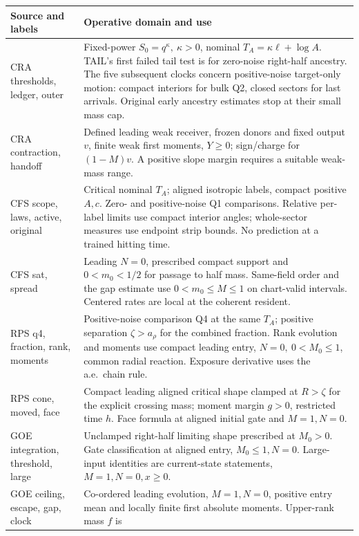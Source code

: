 \documentclass[11pt]{article}
\begin{document}
\small
\begin{longtable}{@{}>{\raggedright\arraybackslash}p{}>{\raggedright\arraybackslash}p{}@{}}
\toprule Source and labels & Operative domain and use\\\midrule\endhead
CRA thresholds, ledger, outer &
Fixed-power \(S_0=q^\kappa,\ \kappa>0\), nominal \(T_A=\kappa\ell+\log A\).
TAIL's first failed tail test is for zero-noise right-half ancestry.
The five subsequent clocks concern positive-noise target-only motion:
compact interiors for bulk Q2, closed sectors for last arrivals.
Original early ancestry estimates stop at their small mass cap.\\
CRA contraction, handoff &
Defined leading weak receiver, frozen donors and fixed output \(v\),
finite weak first moments, \(Y\ge0\); sign/charge for \((1-M)v\).
A positive slope margin requires a suitable weak-mass range.\\
CFS scope, laws, active, original &
Critical nominal \(T_A\); aligned isotropic labels, compact positive
\(A,c\). Zero- and positive-noise Q1 comparisons. Relative per-label
limits use compact interior angles; whole-sector measures use endpoint
strip bounds. No prediction at a trained hitting time.\\
CFS sat, spread &
Leading \(N=0\), prescribed compact support and \(0<m_0<1/2\) for
passage to half mass. Same-field order and the gap estimate use
\(0<m_0\le M\le1\) on chart-valid intervals. Centered rates are local
at the coherent resident.\\
RPS q4, fraction, rank, moments &
Positive-noise comparison Q4 at the same \(T_A\); positive separation
\(\zeta>a_\rho\) for the combined fraction. Rank evolution and moments
use compact leading entry, \(N=0,\ 0<M_0\le1\), common radial
reaction. Exposure derivative uses the a.e.\ chain rule.\\
RPS cone, moved, face &
Compact leading aligned critical shape clamped at \(R>\zeta\) for
the explicit crossing mass; moment margin \(g>0\), restricted
time \(h\). Face formula at aligned initial gate and \(M=1,N=0\).\\
GOE integration, threshold, large &
Unclamped right-half limiting shape prescribed at \(M_0>0\).
Gate classification at aligned entry, \(M_0\le1,N=0\). Large-input
identities are current-state statements, \(M=1,N=0,x\ge0\).\\
GOE ceiling, escape, gap, clock &
Co-ordered leading evolution, \(M=1,N=0\), positive entry mean and
locally finite first absolute moments. Upper-rank mass \(f\) is

\end{longtable}
\end{document}
